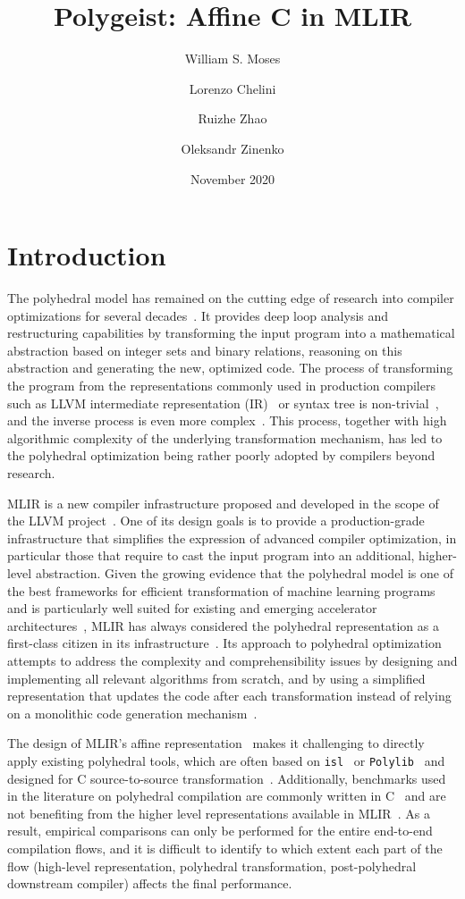 \documentclass[sigplan]{acmart}
\title{Polygeist: Affine C in MLIR}
\date{November 2020}
\author{William S. Moses}
\affiliation{
 \institution{MIT CSAIL}
 \country{}}
\author{Lorenzo Chelini}
\affiliation{
  \institution{TU Eindhoven}
  \country{}}
\author{Ruizhe Zhao}
\affiliation{
  \institution{Imperial College London}
  \country{}}
\author{Oleksandr Zinenko}
\affiliation{
  \institution{Google}
  \country{}}
\newcommand{\icode}[1]{{\texttt {#1}}}
\begin{document}
\maketitle

\section{Introduction}
The polyhedral model has remained on the cutting edge of research into compiler optimizations for several decades~\cite{feautrier2011polyhedron}.
It provides deep loop analysis and restructuring capabilities by transforming the input program into a mathematical abstraction based on integer sets and binary relations, reasoning on this abstraction and generating the new, optimized code.
The process of transforming the program from the representations commonly used in production compilers such as LLVM intermediate representation (IR)~\cite{llvm} or syntax tree is non-trivial~\cite{grosser.ppl.2012,pop2006graphite}, and the inverse process is even more complex~\cite{cloog,razanajato2017splitting,grosser2015polyhedral}.
This process, together with high algorithmic complexity of the underlying transformation mechanism, has led to the polyhedral optimization being rather poorly adopted by compilers beyond research.

MLIR is a new compiler infrastructure proposed and developed in the scope of the LLVM project~\cite{mlir}.
One of its design goals is to provide a production-grade infrastructure that simplifies the expression of advanced compiler optimization, in particular those that require to cast the input program into an additional, higher-level abstraction.
Given the growing evidence that the polyhedral model is one of the best frameworks for efficient transformation of machine learning programs~\cite{tc,teckyl,mullapudi2015polymage} and is particularly well suited for existing and emerging accelerator architectures~\cite{cerebras_chip,ppcg,tc_cim}, MLIR has always considered the polyhedral representation as a first-class citizen in its infrastructure~\cite{mlir_rationale}.
Its approach to polyhedral optimization attempts to address the complexity and comprehensibility issues by designing and implementing all relevant algorithms from scratch, and by using a simplified representation that updates the code after each transformation instead of relying on a monolithic code generation mechanism~\cite{mlir_simplified_polyhedral}.

The design of MLIR's affine representation~\cite{mlir_affine} makes it challenging to directly apply existing polyhedral tools, which are often based on \icode{isl}~\cite{isl} or \icode{Polylib}~\cite{polylib} and designed for C source-to-source transformation~\cite{Bondhugula2008Pluto,ppcg}. Additionally, benchmarks used in the literature on polyhedral compilation are commonly written in C~\cite{polybench} and are not benefiting from the higher level representations available in MLIR~\cite{linalg}. As a result, empirical comparisons can only be performed for the entire end-to-end compilation flows, and it is difficult to identify to which extent each part of the flow (high-level representation, polyhedral transformation, post-polyhedral downstream compiler) affects the final performance. 
\end{document}
